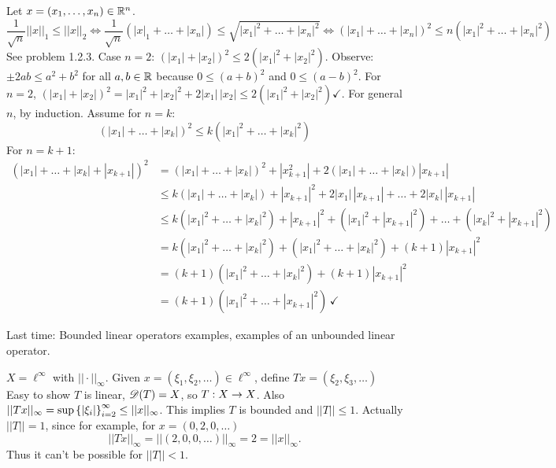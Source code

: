 \documentclass[]{article}
\begin{document}
Let $x=(x_1,\dots,x_n)\in\mathbb{R}^n$.
$$\frac1{\sqrt n} ||x||_1 \leq ||x||_2 \iff \frac1{\sqrt n}(|x|_1+\dots+|x_n|)\leq\sqrt{|x_1|^2+\dots+|x_n|^2} \iff (|x_1|+\dots+|x_n|)^2 \leq n(|x_1|^2 + \dots + |x_n|^2) $$
See problem 1.2.3.
Case $n=2$: $(|x_1|+|x_2|)^2\leq2(|x_1|^2+|x_2|^2)$.
Observe: $\pm 2ab\leq a^2+b^2$ for all $a,b\in\mathbb{R}$ because $0\leq (a+b)^2$ and $0\leq(a-b)^2$.
For $n=2$, $(|x_1|+|x_2|)^2 = |x_1|^2+|x_2|^2+2|x_1|\,|x_2| \leq 2(|x_1|^2+|x_2|^2) \checkmark$.
For general $n$, by induction.
Assume for $n=k$:
$$(|x_1|+\dots+|x_k|)^2\leq k(|x_1|^2+\dots+|x_k|^2)$$
For $n=k+1$:
\begin{align*}
	(|x_1|+\dots+|x_k|+|x_{k+1}|)^2 &= (|x_1|+\dots+|x_k|)^2 + |x_{k+1}^2| + 2(|x_1|+\dots+|x_k|)|x_{k+1}| \\
									&\leq k(|x_1|+\dots+|x_k|)+|x_{k+1}|^2 + 2|x_1|\,|x_{k+1}| + \dots + 2|x_k|\,|x_{k+1}| \\
									&\leq k(|x_1|^2+\dots+|x_k|^2)+|x_{k+1}|^2+(|x_1|^2+|x_{k+1}|^2)+\dots+(|x_k|^2+|x_{k+1}|^2) \\
									&= k(|x_1|^2+\dots+|x_k|^2)+(|x_1|^2+\dots+|x_k|^2) + (k+1)|x_{k+1}|^2 \\
									&= (k+1)(|x_1|^2+\dots+|x_k|^2) + (k+1)|x_{k+1}|^2 \\
									&= (k+1)(|x_1|^2+\dots+|x_{k+1}|^2)\,\checkmark
\end{align*}

Last time: Bounded linear operators examples, examples of an unbounded linear operator.

\begin{example}
	$X=\ell^\infty$ with $||\cdot||_\infty$.
	Given $x=(\xi_1,\xi_2,\dots)\in\ell^\infty$, define $Tx = (\xi_2,\xi_3,\dots)$ 
	Easy to show $T$ is linear, $\mathscr{D}(T)=X$, so $T:X\rightarrow X$.
	Also $||Tx||_\infty = \sup\left\{ |\xi_i| \right\}_{i=2}^\infty\leq||x||_\infty$.
	This implies $T$ is bounded and $||T||\leq1$.
	Actually $||T||=1$, since for example, for $x=(0,2,0,\dots)$
	$$||Tx||_\infty = ||(2,0,0,\dots)||_\infty = 2 = ||x||_\infty.$$
	Thus it can't be possible for $||T||<1$.
\end{example}
\end{document}
